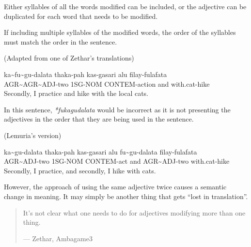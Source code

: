 Either syllables of all the words modified can be included, or the adjective can be duplicated for each word that needs to be modified.

If including multiple syllables of the modified words, the order of the syllables must match the order in the sentence.

(Adapted from one of Zethar's translations)
\begin{exe}
\ex{} \gll{}ka\~{}fu\~{}gu-dalata       thaka-pah kas-gasari     alu filay-fulafata\\
            AGR\~{}AGR\~{}ADJ-two 1SG-NOM   CONTEM-action  and with.cat-hike\\
      \glt{}Secondly, I practice and hike with the local cats.
\end{exe}

In this sentence, \textit{*fukagudalata} would be incorrect as it is not presenting the adjectives in the order that they are being used in the sentence.

(Lemuria's version)
\begin{exe}
\ex{} \gll{}ka\~{}gu-dalata thaka-pah kas-gasari alu fu\~{}gu-dalata filay-fulafata\\
            AGR\~{}ADJ-two  1SG-NOM   CONTEM-act and AGR\~{}ADJ-two  with.cat-hike\\
      \glt{}Secondly, I practice, and secondly, I hike with cats.
\end{exe}

However, the approach of using the same adjective twice causes a semantic change in meaning.
It may simply be another thing that gets ``lost in translation''.

\begin{quote}
    It’s not clear what one needs to do for adjectives modifying more than one thing.

    --- Zethar, Ambagame3
\end{quote}